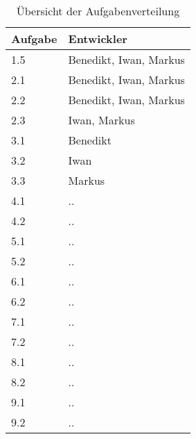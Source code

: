 \vspace{1em}
\begin{table}[!h]
    \centering
    \begin{tabular}{|l|l|}
        \hline
        \textbf{Aufgabe} & \textbf{Entwickler} \\
        \hline
        1.5 & Benedikt, Iwan, Markus \\
        \hline
        2.1 & Benedikt, Iwan, Markus \\
        \hline
        2.2 & Benedikt, Iwan, Markus \\
        \hline
        2.3 & Iwan, Markus \\
        \hline
        3.1 & Benedikt \\
        \hline
        3.2 & Iwan \\
        \hline
        3.3 & Markus \\
        \hline
        4.1 & .. \\
        \hline
        4.2 & .. \\
        \hline
        5.1 & .. \\
        \hline
        5.2 & .. \\
        \hline
        6.1 & .. \\
        \hline
        6.2 & .. \\
        \hline
        7.1 & .. \\
        \hline
        7.2 & .. \\
        \hline
        8.1 & .. \\
        \hline
        8.2 & .. \\
        \hline
        9.1 & .. \\
        \hline
        9.2 & .. \\
        \hline
    \end{tabular}
    \caption{Übersicht der Aufgabenverteilung}
    \label{tab:arbeitsverteilung}
\end{table}

\newpage

